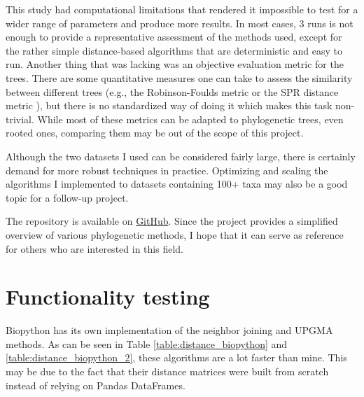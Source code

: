\documentclass[11pt,twocolumn]{article}
\begin{document}
This study had computational limitations that rendered it impossible to test for a wider range of parameters and produce more results. In most cases, 3 runs is not enough to provide a representative assessment of the methods used, except for the rather simple distance-based algorithms that are deterministic and easy to run. Another thing that was lacking was an objective evaluation metric for the trees. There are some quantitative measures one can take to assess the similarity between different trees (e.g., the Robinson-Foulds metric or the SPR distance metric \cite{Hickey2008}), but there is no standardized way of doing it which makes this task non-trivial. While most of these metrics can be adapted to phylogenetic trees, even rooted ones, comparing them may be out of the scope of this project.

Although the two datasets I used can be considered fairly large, there is certainly demand for more robust techniques in practice. Optimizing and scaling the algorithms I implemented to datasets containing 100+ taxa may also be a good topic for a follow-up project.

The repository is available on \href{https://github.com/Leena01/computational_biology}{GitHub}. Since the project provides a simplified overview of various phylogenetic methods, I hope that it can serve as reference for others who are interested in this field.

\hypersetup{
	urlcolor=black
}



\onecolumn
\appendixpage
\appendix
\hypersetup{
	urlcolor=blue
}
\section{Functionality testing}
\label{sec:functionality_testing}

Biopython has its own implementation of the neighbor joining and UPGMA methods. As can be seen in Table \ref{table:distance_biopython} and \ref{table:distance_biopython_2}, these algorithms are a lot faster than mine. This may be due to the fact that their distance matrices were built from scratch instead of relying on Pandas DataFrames.
\end{document}
